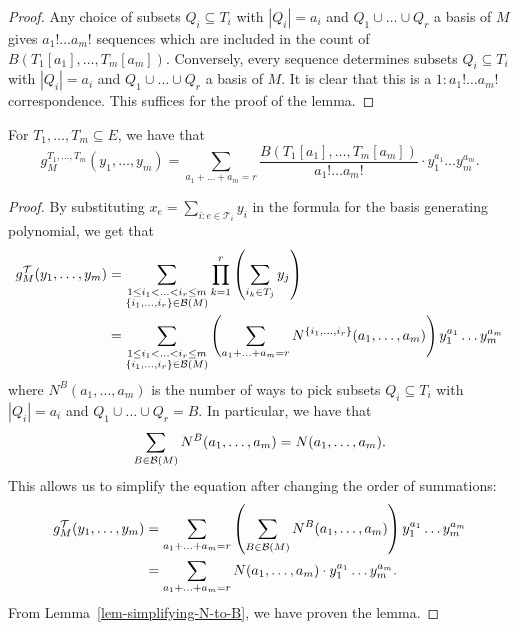 \documentclass{puthesis-UG}
\begin{document}
\begin{proof}
	Any choice of subsets $Q_i \subseteq T_i$ with $|Q_i| = a_i$ and $Q_1 \cup \ldots \cup Q_r$ a basis of $M$ gives $a_1! \ldots a_m!$ sequences which are included in the count of $B(T_1[a_1], \ldots, T_m[a_m])$. Conversely, every sequence determines subsets $Q_i \subseteq T_i$ with $|Q_i| = a_i$ and $Q_1 \cup \ldots \cup Q_r$ a basis of $M$. It is clear that this is a $1 : a_1! \ldots a_m!$ correspondence. This suffices for the proof of the lemma. 
\end{proof}

\begin{prop}
	For $T_1, \ldots, T_m \subseteq E$, we have that 
	\[	
		g_M^{T_1, \ldots, T_m} (y_1, \ldots, y_m) = \sum_{a_1 + \ldots + a_m = r} \frac{B(T_1[a_1], \ldots, T_m[a_m])}{a_1! \ldots a_m!} \cdot y_1^{a_1} \ldots y_m^{a_m}.
	\]
\end{prop}

\begin{proof}
	By substituting $x_e = \sum_{i : e \in \mathcal{T}_i} y_i$ in the formula for the basis generating polynomial, we get that 
	\begin{align*}
		g_M^{\mathcal{T}}(y_1, \ldots, y_m) & = \sum_{\substack{1 \leq i_1 < \ldots < i_r \leq m \\ \{i_1, \ldots, i_r\} \in \mathcal{B}(M)}} \prod_{k = 1}^r \left ( \sum_{i_k \in T_j} y_j \right ) \\
		& = \sum_{\substack{1 \leq i_1 < \ldots < i_r \leq m \\ \{i_1, \ldots, i_r\} \in \mathcal{B}(M)}} \left (\sum_{a_1 + \ldots + a_m = r} N^{\{i_1, \ldots, i_r\}}(a_1, \ldots, a_m) \right ) y_1^{a_1} \ldots y_m^{a_m}
	\end{align*}
	where $N^B(a_1, \ldots, a_m)$ is the number of ways to pick subsets $Q_i \subseteq T_i$ with $|Q_i| = a_i$ and $Q_1 \cup \ldots \cup Q_r = B$. In particular, we have that 
	\[	
		\sum_{B \in \mathcal{B}(M)} N^B (a_1, \ldots, a_m) = N(a_1, \ldots, a_m). 
	\]
	This allows us to simplify the equation after changing the order of summations: 
	\begin{align*}
		g_M^{\mathcal{T}}(y_1, \ldots, y_m) & = \sum_{a_1 + \ldots + a_m = r} \left ( \sum_{B \in \mathcal{B}(M)} N^B (a_1, \ldots, a_m) \right ) y_1^{a_1} \ldots y_m^{a_m} \\
		& = \sum_{a_1 + \ldots + a_m = r} N(a_1, \ldots, a_m) \cdot y_1^{a_1} \ldots y_m^{a_m}.
	\end{align*}
	From Lemma~\ref{lem-simplifying-N-to-B}, we have proven the lemma. 
\end{proof}
\end{document}
